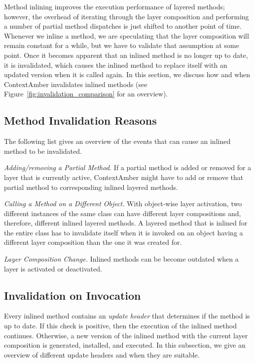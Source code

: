 \documentclass{sig-alternate}
\begin{document}
Method inlining improves the execution performance of layered methods; however, the overhead of iterating through the layer composition and performing a number of partial method dispatches is just shifted to another point of time. Whenever we inline a method, we are speculating that the layer composition will remain constant for a while, but we have to validate that assumption at some point. Once it becomes apparent that an inlined method is no longer up to date, it is invalidated, which causes the inlined method to replace itself with an updated version when it is called again. In this section, we discuss how and when ContextAmber invalidates inlined methods (see Figure~\ref{fig:invalidation_comparison} for an overview).

\subsection{Method Invalidation Reasons}
The following list gives an overview of the events that can cause an inlined method to be invalidated.

\begin{compact_item}
    \item \emph{Adding/removing a Partial Method.} If a partial method is added or removed for a layer that is currently active, ContextAmber might have to add or remove that partial method to corresponding inlined layered methods.
    \item \emph{Calling a Method on a Different Object.} With object-wise layer activation, two different instances of the same class can have different layer compositions and, therefore, different inlined layered methods. A layered method that is inlined for the entire class has to invalidate itself when it is invoked on an object having a different layer composition than the one it was created for.
    \item \emph{Layer Composition Change.} Inlined methods can be become outdated when a layer is activated or deactivated.
\end{compact_item}

\subsection{Invalidation on Invocation}
Every inlined method contains an \emph{update header} that determines if the method is up to date. If this check is positive, then the execution of the inlined method continues. Otherwise, a new version of the inlined method with the current layer composition is generated, installed, and executed. In this subsection, we give an overview of different update headers and when they are suitable.
\end{document}
